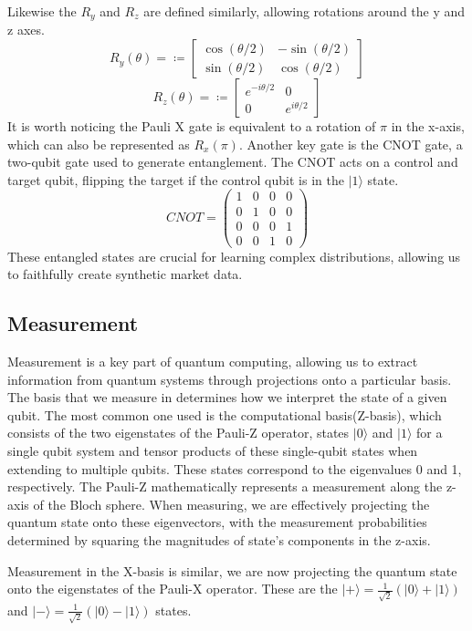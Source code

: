 \documentclass[12pt]{article}
\newcommand{\newp}
    {
    \vskip 0.5cm 
  }
\numberwithin{equation}{section}
\begin{document}
Likewise the $R_y$ and $R_z$ are defined similarly, allowing rotations around the 
y and z axes.
$$
R_y(\theta) = \coloneqq 
\begin{bmatrix}
\cos(\theta/2) & -\sin(\theta/2) \\
\sin(\theta/2) & \cos(\theta/2)
\end{bmatrix}
$$
$$
R_z(\theta) = \coloneqq 
\begin{bmatrix}
e^{-i\theta/2} & 0 \\
0 & e^{i\theta/2}
\end{bmatrix}
$$
It is worth noticing the Pauli X gate is equivalent to a rotation of $\pi$ in the 
x-axis, which can also be represented as $R_x(\pi)$. 
Another key gate is the CNOT gate, a two-qubit gate used to generate entanglement. 
The CNOT acts on a control and target qubit, flipping the target if the control 
qubit is in the $|1\rangle$ state. 
$$
CNOT =
\begin{pmatrix}
1 & 0 & 0 & 0 \\
0 & 1 & 0 & 0 \\
0 & 0 & 0 & 1 \\
0 & 0 & 1 & 0
\end{pmatrix}
$$
These entangled states are crucial for learning complex distributions, allowing us 
to faithfully create synthetic market data. 
\subsection{Measurement}
Measurement is a key part of quantum computing, allowing us to extract information 
from quantum systems through projections onto a particular basis. The basis that 
we measure in determines how we interpret the state of a given qubit. The most common 
one used is the computational basis(Z-basis), which consists of the 
two eigenstates of the Pauli-Z operator, states $|0\rangle$ and $|1\rangle$ 
for a single qubit system and tensor products of these single-qubit states when 
extending to multiple qubits. These states correspond to the eigenvalues 0 and 1, 
respectively. The Pauli-Z mathematically represents a measurement along the z-axis
of the Bloch sphere. When measuring, we are effectively projecting the quantum 
state onto these eigenvectors, with the measurement probabilities determined 
by squaring the magnitudes of state's components in the z-axis.
\newp 
Measurement in the X-basis is similar, we are now projecting the quantum state onto 
the eigenstates of the Pauli-X operator. These are the 
$|+\rangle = \frac{1}{\sqrt{2}}(|0\rangle+|1\rangle)$ and 
$|-\rangle = \frac{1}{\sqrt{2}}(|0\rangle-|1\rangle)$ states. 
\end{document}
